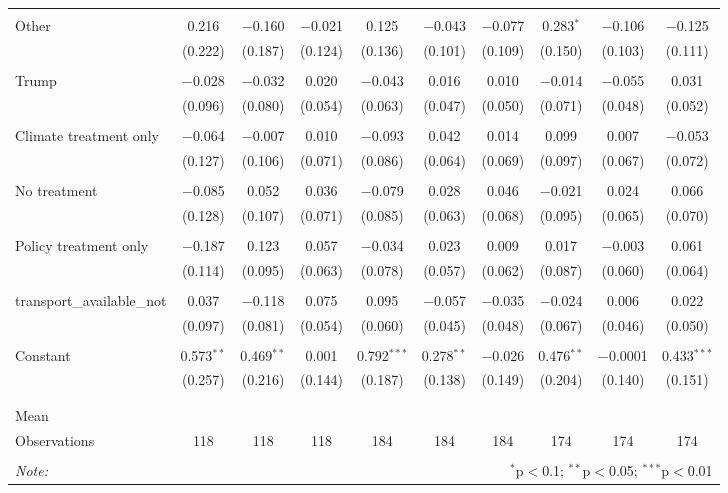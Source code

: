 \begin{tabular}{@{\extracolsep{5pt}}lccccccccc}
  & & & & & & & & & \\ 
 Other & 0.216 & $-$0.160 & $-$0.021 & 0.125 & $-$0.043 & $-$0.077 & 0.283$^{*}$ & $-$0.106 & $-$0.125 \\ 
  & (0.222) & (0.187) & (0.124) & (0.136) & (0.101) & (0.109) & (0.150) & (0.103) & (0.111) \\ 
  & & & & & & & & & \\ 
 Trump & $-$0.028 & $-$0.032 & 0.020 & $-$0.043 & 0.016 & 0.010 & $-$0.014 & $-$0.055 & 0.031 \\ 
  & (0.096) & (0.080) & (0.054) & (0.063) & (0.047) & (0.050) & (0.071) & (0.048) & (0.052) \\ 
  & & & & & & & & & \\ 
 Climate treatment only & $-$0.064 & $-$0.007 & 0.010 & $-$0.093 & 0.042 & 0.014 & 0.099 & 0.007 & $-$0.053 \\ 
  & (0.127) & (0.106) & (0.071) & (0.086) & (0.064) & (0.069) & (0.097) & (0.067) & (0.072) \\ 
  & & & & & & & & & \\ 
 No treatment & $-$0.085 & 0.052 & 0.036 & $-$0.079 & 0.028 & 0.046 & $-$0.021 & 0.024 & 0.066 \\ 
  & (0.128) & (0.107) & (0.071) & (0.085) & (0.063) & (0.068) & (0.095) & (0.065) & (0.070) \\ 
  & & & & & & & & & \\ 
 Policy treatment only & $-$0.187 & 0.123 & 0.057 & $-$0.034 & 0.023 & 0.009 & 0.017 & $-$0.003 & 0.061 \\ 
  & (0.114) & (0.095) & (0.063) & (0.078) & (0.057) & (0.062) & (0.087) & (0.060) & (0.064) \\ 
  & & & & & & & & & \\ 
 transport\_available\_not & 0.037 & $-$0.118 & 0.075 & 0.095 & $-$0.057 & $-$0.035 & $-$0.024 & 0.006 & 0.022 \\ 
  & (0.097) & (0.081) & (0.054) & (0.060) & (0.045) & (0.048) & (0.067) & (0.046) & (0.050) \\ 
  & & & & & & & & & \\ 
 Constant & 0.573$^{**}$ & 0.469$^{**}$ & 0.001 & 0.792$^{***}$ & 0.278$^{**}$ & $-$0.026 & 0.476$^{**}$ & $-$0.0001 & 0.433$^{***}$ \\ 
  & (0.257) & (0.216) & (0.144) & (0.187) & (0.138) & (0.149) & (0.204) & (0.140) & (0.151) \\ 
  & & & & & & & & & \\ 
\hline \\[-1.8ex] 
Mean &  &  &  &  &  &  &  &  &  \\ 
Observations & 118 & 118 & 118 & 184 & 184 & 184 & 174 & 174 & 174 \\ 
\hline 
\hline \\[-1.8ex] 
\textit{Note:}  & \multicolumn{9}{r}{$^{*}$p$<$0.1; $^{**}$p$<$0.05; $^{***}$p$<$0.01} \\ 
\end{tabular} 
